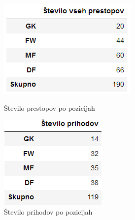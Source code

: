 \documentclass[a4paper, 12pt]{article}
\begin{document}
\begin{figure}[!htb]
\includegraphics[width=\linewidth]{tabela5}
\caption{Število prestopov po pozicijah}\label{fig:tabela5}
\endminipage\hfill
{}
\includegraphics[width=\linewidth]{tabela6}
\caption{Število prihodov po pozicijah}\label{fig:tabela6}
\endminipage\hfill
{}

\end{figure}
\end{document}

